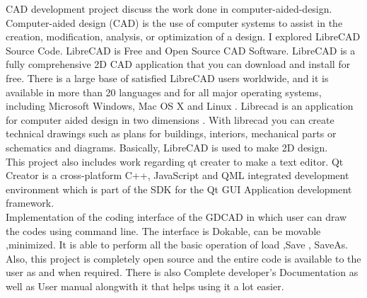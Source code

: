 \begin{Large}
\end{Large}

\noindent CAD development project discuss the work done in computer-aided-design. Computer-aided design (CAD) is the use of computer systems to assist in the creation, modification, analysis, or optimization of a design. I explored  LibreCAD  Source  Code. LibreCAD is Free and Open Source CAD Software. LibreCAD is a  fully  comprehensive  2D  CAD   application  that  you  can  download  and  install  for  free.  There  is  a  large base  of  satisfied  LibreCAD   users  worldwide,  and  it  is  available  in  more  than  20  languages  and  for  all
major  operating  systems,  including  Microsoft  Windows,  Mac  OS  X  and  Linux .  Librecad  is  an  application  for  computer  aided  design  in  two dimensions  .  With  librecad   you   can  create  technical  drawings  such  as  plans  for  buildings,  interiors,
mechanical parts or schematics and diagrams. Basically, LibreCAD is used to make 2D design. \\
\noindent This project also includes work regarding qt creater to make a text editor. Qt Creator is a cross-platform C++, JavaScript and QML integrated development environment which is part of the SDK for the Qt GUI Application development framework.\\ 
\noindent Implementation of the coding interface of the GDCAD in which user can draw the codes using 
command line. The interface is Dokable, can be movable ,minimized. It is able to perform all 
the basic operation of load ,Save , SaveAs.\\
\noindent Also, this project is completely open source and the entire code is available 
to the user as and when required. There is also Complete developer's 
Documentation as well as User manual alongwith it that helps using it a lot easier.